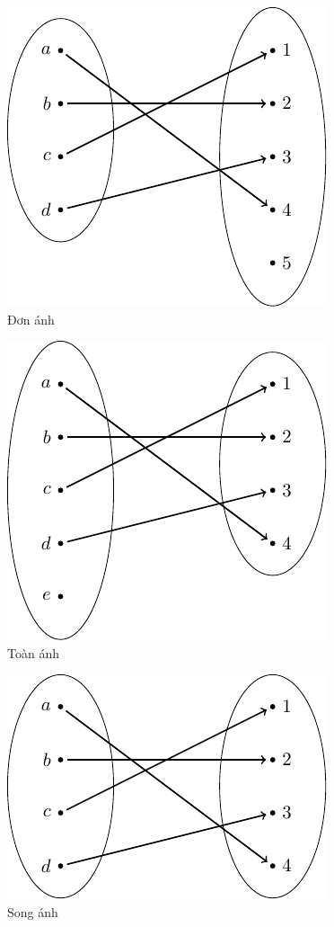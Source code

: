 \begin{figure}[ht]
    \centering
    \includegraphics{../pics/maps/injection.pdf}
    \caption{Đơn ánh}
\end{figure}

\begin{figure}[ht]
    \centering
    \includegraphics{../pics/maps/surjection.pdf}
    \caption{Toàn ánh}
\end{figure}

\begin{figure}[ht]
    \centering
    \includegraphics{../pics/maps/bijection.pdf}
    \caption{Song ánh}
\end{figure}

